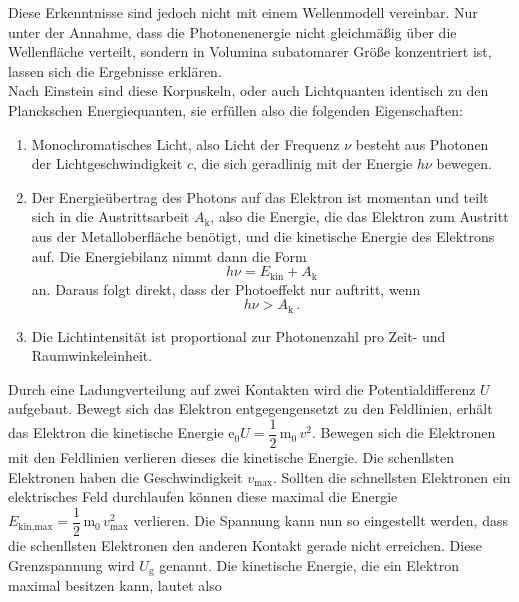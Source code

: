 Diese Erkenntnisse sind jedoch nicht mit einem Wellenmodell vereinbar.
Nur unter der Annahme, dass die Photonenenergie nicht gleichmäßig über die Wellenfläche verteilt,
sondern in Volumina subatomarer Größe konzentriert ist, lassen sich die Ergebnisse erklären. \\

Nach Einstein sind diese Korpuskeln, oder auch Lichtquanten identisch zu den Planckschen Energiequanten,
sie erfüllen also die folgenden Eigenschaften:

\begin{enumerate}
    \item Monochromatisches Licht, also Licht der Frequenz $\nu$ besteht aus Photonen der Lichtgeschwindigkeit $c$,
            die sich geradlinig mit der Energie $h\nu$ bewegen.
    \item Der Energieübertrag des Photons auf das Elektron ist momentan und teilt sich in die Austrittsarbeit $A_\text{k}$, 
            also die Energie, die das Elektron zum Austritt aus der Metalloberfläche benötigt, 
            und die kinetische Energie des Elektrons auf. Die Energiebilanz nimmt dann die 
            Form
            \begin{equation}
                h \nu = E_\text{kin} + A_\text{k}
                \label{eq:energiebilanz}
            \end{equation}
            an.
            Daraus folgt direkt, dass der Photoeffekt nur auftritt, wenn
            \begin{equation*}
                h \nu > A_\text{k} \,.
            \end{equation*}
    \item Die Lichtintensität ist proportional zur Photonenzahl pro Zeit- und Raumwinkeleinheit.
\end{enumerate}

Durch eine Ladungverteilung auf zwei Kontakten wird die Potentialdifferenz $U$ aufgebaut.
Bewegt sich das Elektron entgegengensetzt zu den Feldlinien, erhält das Elektron die kinetische Energie $\text{e}_0 U = \dfrac{1}{2} \, \text{m}_0 \, v^2 $.
Bewegen sich die Elektronen mit den Feldlinien verlieren dieses die kinetische Energie.
Die schenllsten Elektronen haben die Geschwindigkeit $v_\text{max}$. 
Sollten die schnellsten Elektronen ein elektrisches Feld durchlaufen können diese maximal die Energie $E_\text{kin,max} = \dfrac{1}{2} \, \text{m}_0 \, v^2_\text{max}$ verlieren.
Die Spannung kann nun so eingestellt werden, dass die schenllsten Elektronen den anderen Kontakt gerade nicht erreichen.
Diese Grenzspannung wird $U_\text{g}$ genannt. Die kinetische Energie, die ein Elektron maximal besitzen kann, lautet also

